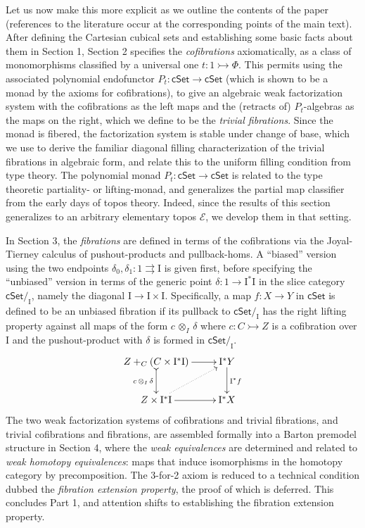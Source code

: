 \documentclass[11pt,reqno]{amsart}
\newcommand{\EE}{\ensuremath{\mathcal{E}}}
\newcommand{\cSet}{\ensuremath{\mathsf{cSet}}}
\newcommand{\slice}[1]{\ensuremath{/_{\!{#1}}}}
\newcommand{\mono}{\ensuremath{\rightarrowtail}}
\newcommand{\cof}{\ensuremath{\rightarrowtail}}
\renewcommand{\to}{\ensuremath{\rightarrow}}
\newcommand{\I}{\ensuremath{\mathrm{I}}}
\theoremstyle{remark}
\theoremstyle{definition}
\begin{document}
Let us now make this more explicit as we outline the contents of the paper (references to the literature occur at the corresponding points of the main text).
After defining the Cartesian cubical sets and establishing some basic facts about them in Section 1, Section 2  specifies the \emph{cofibrations} axiomatically, as a class of monomorphisms classified by a universal one $t:1 \cof \Phi$.  This permits using the associated polynomial endofunctor $P_t : \cSet\to \cSet$ (which is shown to be a monad by the axioms for cofibrations), to give an algebraic weak factorization system with the cofibrations as the left maps and the (retracts of) $P_t$-algebras as the maps on the right, which we define to be the \emph{trivial fibrations}.  Since the monad is fibered, the factorization system is stable under change of base, which we use to derive the familiar diagonal filling characterization of the trivial fibrations in algebraic form, and relate this to the uniform filling condition from type theory.  The polynomial monad $P_t : \cSet\to \cSet$ is related to the type theoretic partiality- or lifting-monad, and generalizes the partial map classifier from the early days of topos theory.  Indeed, since the results of this section generalizes to an arbitrary elementary topos \EE, we develop them in that setting. 

In Section 3, the \emph{fibrations} are defined in terms of the cofibrations via the Joyal-Tierney calculus of pushout-products and pullback-homs.  A ``biased'' version using the two endpoints $\delta_0, \delta_1: 1\rightrightarrows\I$ is given first, before specifying the ``unbiased''  version in terms of the generic point $\delta : 1 \to \I^*\I$  in the slice category $\cSet\slice{\I}$, namely the diagonal $\I \to \I\times\I$.  Specifically, a map $f : X \to Y$ in $\cSet$ is defined to be an unbiased fibration if its pullback to $\cSet\slice{\I}$ has the right lifting property against all maps of the form $c\, \otimes_I\, \delta$ where $c : C\mono Z$ is a cofibration over $\I$ and the pushout-product with $\delta$ is formed in $\cSet\slice{\I}$. 
\begin{equation*}\label{diagram:unbiasedfibrationIntro}
\xymatrix{
Z +_C (C\times\I^*\I) \ar@{>->}[d]_{c\, \otimes_I\, \delta} \ar[r] & \I^*Y \ar[d]^{\I^*f} \\
Z\times \I^*\I \ar@{.>}[ru] \ar[r] & \I^*X
}
\end{equation*}
%
The two weak factorization systems of cofibrations and trivial fibrations, and trivial cofibrations and fibrations, are assembled formally into a Barton premodel structure in Section 4, where the \emph{weak equivalences} are determined and related to \emph{weak homotopy equivalences}:  maps that induce isomorphisms in the homotopy category by precomposition.  The 3-for-2 axiom is reduced to a technical condition dubbed the \emph{fibration extension property}, the proof of which is deferred.  This concludes Part 1, and attention shifts to establishing the fibration extension property.
\end{document}

